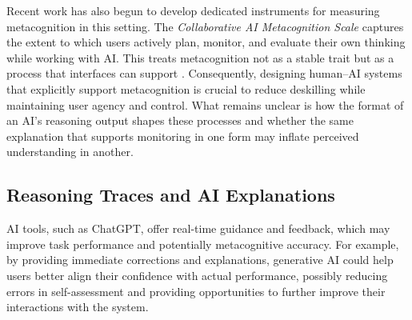 \documentclass[acmlarge,review=true, anonymous=true]{acmart}
\begin{document}
Recent work has also begun to develop dedicated instruments for measuring metacognition in this setting. The \textit{Collaborative AI Metacognition Scale} captures the extent to which users actively plan, monitor, and evaluate their own thinking while working with AI. This treats metacognition not as a stable trait but as a process that interfaces can support \cite{Sidra03042026}. Consequently, designing human–AI systems that explicitly support metacognition is crucial to reduce deskilling while maintaining user agency and control. What remains unclear is how the format of an AI's reasoning output shapes these processes and whether the same explanation that supports monitoring in one form may inflate perceived understanding in another.



\subsection{Reasoning Traces and AI Explanations}
AI tools, such as ChatGPT, offer real-time guidance and feedback, which may improve task performance and potentially metacognitive accuracy. For example, by providing immediate corrections and explanations, generative AI could help users better align their confidence with actual performance, possibly reducing errors in self-assessment and providing opportunities to further improve their interactions with the system.
\end{document}
